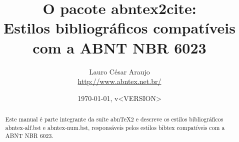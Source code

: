 \documentclass[a4paper]{ltxdoc}
\begin{document}
\nocite{cesar1994,azevedo1994,batista1992,chueire1994}
\nocite{duran1993,chemello1993}
\nocite{arbex1993,carvalho1994,miglori1993,amaral1994,rodrigues1994}
\nocite{carruth1993,saadi1994,mandino1994}
\nocite{makau1962,lion1981}
\nocite{morgado1990,araujo1986}
\nocite{morgadob1990}
\nocite{morgadoc1990}
\nocite{laurenti1978,marins1991,malagrino1985,zilberman1998,holanda1994,pelosi1993,tringali1994,delosmar1997,resprinb1997,cardim1984}
\nocite{cretella1992,boletime1965}
\nocite{freyre1943,freyre1936}
\nocite{freyreg1936,freyre1938}
\nocite{DOI}
\nocite{hamada2008}

\nocite{ABNT-final}

\newcommand{\titulo}{\textbf{O pacote \textsf{abntex2cite}}:\\
\Large{Estilos bibliográficos compatíveis com a ABNT NBR 6023}}
\newcommand{\abnTeX}{abn\TeX}
\newcommand{\abnTeXSite}{\url{http://www.abntex.net.br/}}
\newcommand{\optiondefaultval}[1]{\underline{\texttt{#1}}}

\title{\titulo}
\author{Lauro César Araujo\\\abnTeXSite}
\date{\today, v<VERSION>}


% 

\maketitle

\begin{abstract}
Este manual é parte integrante da suíte \abnTeX2 e descreve os estilos
bibliográficos \textsf{abntex-alf.bst} e \textsf{abntex-num.bst}, responsáveis
pelos estilos \textsf{bibtex} compatíveis com a ABNT NBR 6023.
\end{abstract}
\end{document}
